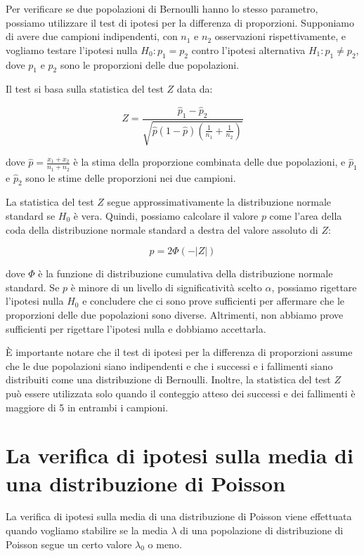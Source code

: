 Per verificare se due popolazioni di Bernoulli hanno lo stesso parametro, possiamo utilizzare il test di ipotesi per la differenza di proporzioni. Supponiamo di avere due campioni indipendenti, con $n_1$ e $n_2$ osservazioni rispettivamente, e vogliamo testare l'ipotesi nulla $H_0: p_1 = p_2$ contro l'ipotesi alternativa $H_1: p_1 \neq p_2$, dove $p_1$ e $p_2$ sono le proporzioni delle due popolazioni.

Il test si basa sulla statistica del test $Z$ data da:

$$Z = \frac{\hat{p}_1 - \hat{p}_2}{\sqrt{\hat{p}(1 - \hat{p})\left(\frac{1}{n_1}+\frac{1}{n_2}\right)}}$$

dove $\hat{p} = \frac{x_1 + x_2}{n_1 + n_2}$ è la stima della proporzione combinata delle due popolazioni, e $\hat{p}_1$ e $\hat{p}_2$ sono le stime delle proporzioni nei due campioni.

La statistica del test $Z$ segue approssimativamente la distribuzione normale standard se $H_0$ è vera. Quindi, possiamo calcolare il valore $p$ come l'area della coda della distribuzione normale standard a destra del valore assoluto di $Z$:

$$p = 2\Phi(-|Z|)$$

dove $\Phi$ è la funzione di distribuzione cumulativa della distribuzione normale standard. Se $p$ è minore di un livello di significatività scelto $\alpha$, possiamo rigettare l'ipotesi nulla $H_0$ e concludere che ci sono prove sufficienti per affermare che le proporzioni delle due popolazioni sono diverse. Altrimenti, non abbiamo prove sufficienti per rigettare l'ipotesi nulla e dobbiamo accettarla.

È importante notare che il test di ipotesi per la differenza di proporzioni assume che le due popolazioni siano indipendenti e che i successi e i fallimenti siano distribuiti come una distribuzione di Bernoulli. Inoltre, la statistica del test $Z$ può essere utilizzata solo quando il conteggio atteso dei successi e dei fallimenti è maggiore di 5 in entrambi i campioni.

\section{La verifica di ipotesi sulla media di una distribuzione di Poisson}

La verifica di ipotesi sulla media di una distribuzione di Poisson viene effettuata quando vogliamo stabilire se la media $\lambda$ di una popolazione di distribuzione di Poisson segue un certo valore $\lambda_0$ o meno.

